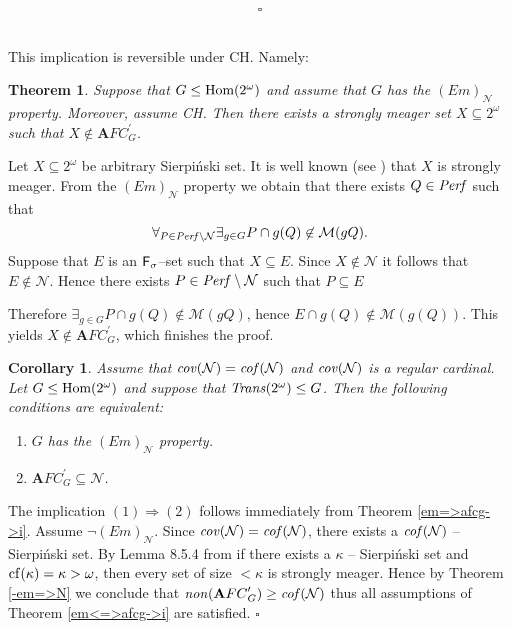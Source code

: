 \documentclass[b5cutpaper, twoside, 11pt, leqno]{moravica}
\newcommand{\afcp}{{\mathbf AFC}^\prime}
\newcommand\afcg{\afcp_{G}}
\newcommand\trans{{\it Trans}(\ca)}
\newcommand\ooo{\underline{O}}
\newcommand{\seq}{\subseteq}
\newcommand{\ca}{2^{\omega}}
\newcommand{\mgr}{{\mathcal M}}
\newcommand{\neglig}{{\mathcal N}}
\newcommand{\oo}{\omega}
\newcommand{\perf}{{\it Perf}}
\newcommand{\fsigma}{{\sf F}_{\sigma}}
\newcommand{\cof}{{\it cof}}
\newcommand{\cov}{{\it cov}}
\newcommand{\non}{{\it non}}
\newcommand\Hom{{\rm Hom(\ca)}}
\newcommand{\cf}{{\rm cf}}
\newtheorem{theorem}{Theorem}[section]
\newtheorem{corollary}{Corollary}[section]
\theoremstyle{definition}
\begin{document}

$$\square$$

 \\

This implication is reversible
under CH. Namely:

\begin{theorem}
Suppose that $G \leq \Hom$ and assume that $G$ has the $(Em)_{\neglig}$
property. Moreover, assume CH. Then there exists a strongly
meager set $X\seq\ca$ such that $X \not\in \afcg$.
\end{theorem}


\proof

  Let $X\seq\ca$ be arbitrary Sierpi\'nski set.
It is well known (see \cite{P}) that $X$ is
strongly meager.
  From the $(Em)_{\neglig}$ property we obtain that
there exists $Q \in \perf$ such that
  \[
    \forall_{P \in \perf \setminus \neglig}
    \exists_{g \in G} P \cap g(Q) \not\in \mgr(gQ).
  \]
Suppose that $E$ is an $\fsigma$--set such that $X \seq E$.
Since $X \not \in \neglig$ it follows that $E \not \in \neglig$.
  Hence there exists $P \in \perf \setminus \neglig $ such that
$P \seq E$

Therefore $\exists_{g \in G} P \cap g(Q) \not\in \mgr(gQ)$,
hence $E \cap g(Q) \not\in \mgr(g(Q))$.
  This yields $X \not\in \afcg$, which finishes the proof.

\begin{corollary}
\label{corollary_1}
  Assume that $\cov(\neglig) = \cof(\neglig)$ and
$\cov(\neglig)$ is a regular cardinal.
  Let $G \leq \Hom$ and suppose that $\trans \leq G$.
Then the following conditions are equivalent:

  \begin{enumerate}
  \item
    $G$ has the $(Em)_{\neglig}$ property.

  \item
    $\afcg \seq \neglig$.

  \end{enumerate}
\end{corollary}

\proof
  The implication $(1) \Rightarrow (2)$ follows immediately
from Theorem \ref{em=>afcg->i}.
  Assume $\neg (Em)_{\neglig}$. Since $\cov(\neglig) = \cof(\neglig)$,
there exists a $\cof(\neglig)$ -- Sierpi\'nski set.
  By Lemma 8.5.4 from \cite{BJ}
if there exists a $\kappa$ -- Sierpi\'nski set
and $\cf(\kappa) = \kappa > \oo$,
then every set of size $< \kappa$ is strongly meager.
  Hence by Theorem \ref{-em=>N} we conclude that
$\non(\afcg) \geq \cof(\neglig)$
thus all assumptions of Theorem \ref{em<=>afcg->i} are satisfied.
  $\square$
\end{document}
